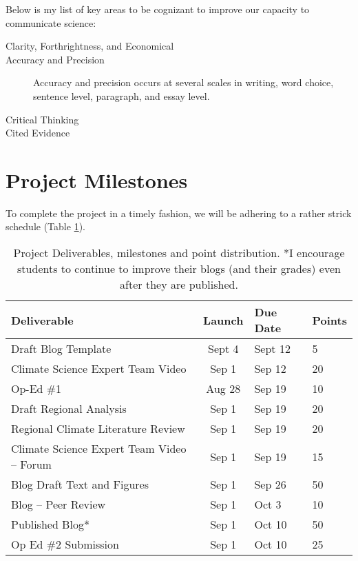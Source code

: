 \documentclass{article}\usepackage[]{graphicx}\usepackage[]{color}
\begin{document}
Below is my list of key areas to be cognizant to improve our capacity to communicate science:

\begin{description}
  \item[Clarity, Forthrightness, and Economical]
  \item[Accuracy and Precision] Accuracy and precision occurs at several scales in writing, word choice, sentence level, paragraph, and essay level. 
  \item[Critical Thinking]
  \item[Cited Evidence]
\end{description}



\section{Project Milestones}

To complete the project in a timely fashion, we will be adhering to a rather strick schedule (Table \ref{tab:milestones}).

\begin{table}[h]

\caption{Project Deliverables, milestones and point distribution. *I encourage students to continue to improve their blogs (and their grades) even after they are published.}
\label{tab:milestones}
\begin{tabular}{lcll}\hline
Deliverable                 & Launch    & Due Date  & Points \\\hline\hline
Draft Blog Template         & Sept 4    & {\color{red}Sept 12}   & 5 \\
Climate Science Expert Team Video & Sep 1 & Sep 12   & 20 \\
Op-Ed \#1                   & Aug 28    & {\color{red}Sep 19}    & 10 \\
Draft Regional Analysis     & Sep 1     & {\color{red}Sep 19}   & 20 \\
Regional Climate Literature Review  & Sep 1   & {\color{red}Sep 19}   & 20\\
Climate Science Expert Team Video -- Forum    & Sep 1  & Sep 19     & 15 \\
Blog Draft {\color{red}Text and Figures} & Sep 1   & Sep 26    & 50 \\
Blog -- Peer Review         & Sep 1    & Oct 3    & 10\\
Published Blog*              & Sep 1    & Oct 10   & 50 \\
Op Ed \#2 Submission        & Sep 1    & Oct 10    & 25 \\ \hline
\end{tabular}
\end{table}
\end{document}
